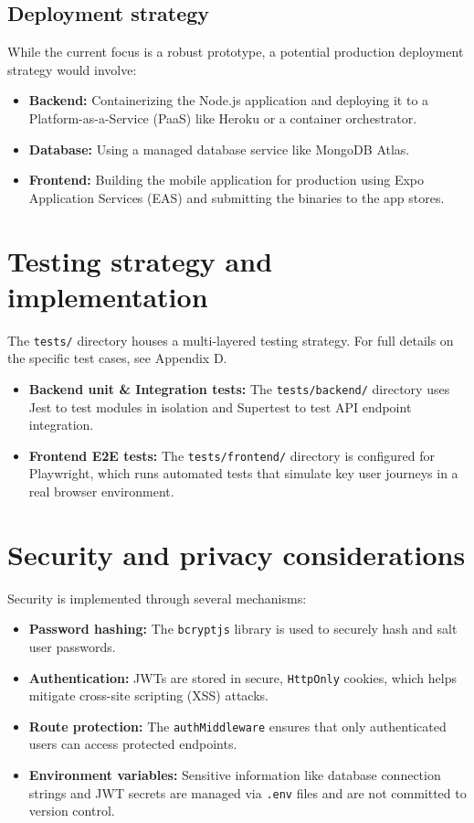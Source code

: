 \subsection{Deployment strategy}
While the current focus is a robust prototype, a potential production deployment strategy would involve:
\begin{itemize}
    \item \textbf{Backend:} Containerizing the Node.js application and deploying it to a Platform-as-a-Service (PaaS) like Heroku or a container orchestrator.
    \item \textbf{Database:} Using a managed database service like MongoDB Atlas.
    \item \textbf{Frontend:} Building the mobile application for production using Expo Application Services (EAS) and submitting the binaries to the app stores.
\end{itemize}

\section{Testing strategy and implementation}
The \texttt{tests/} directory houses a multi-layered testing strategy. For full details on the specific test cases, see Appendix D.
\begin{itemize}
    \item \textbf{Backend unit \& Integration tests:} The \texttt{tests/backend/} directory uses Jest to test modules in isolation and Supertest to test API endpoint integration.
    \item \textbf{Frontend E2E tests:} The \texttt{tests/frontend/} directory is configured for Playwright, which runs automated tests that simulate key user journeys in a real browser environment.
\end{itemize}

\section{Security and privacy considerations}
Security is implemented through several mechanisms:
\begin{itemize}
    \item \textbf{Password hashing:} The \texttt{bcryptjs} library is used to securely hash and salt user passwords.
    \item \textbf{Authentication:} JWTs are stored in secure, \texttt{HttpOnly} cookies, which helps mitigate cross-site scripting (XSS) attacks.
    \item \textbf{Route protection:} The \texttt{authMiddleware} ensures that only authenticated users can access protected endpoints.
    \item \textbf{Environment variables:} Sensitive information like database connection strings and JWT secrets are managed via \texttt{.env} files and are not committed to version control.
\end{itemize}



